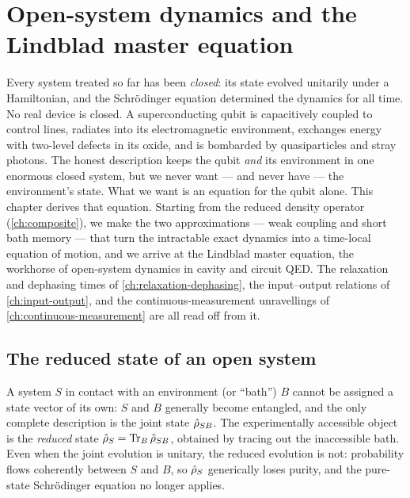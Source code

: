 \chapter{Open-system dynamics and the Lindblad master equation}
\label{ch:open-systems}

Every system treated so far has been \emph{closed}: its state
evolved unitarily under a Hamiltonian, and the Schrödinger
equation determined the dynamics for all time. No real device is
closed. A superconducting qubit is capacitively coupled to control
lines, radiates into its electromagnetic environment, exchanges
energy with two-level defects in its oxide, and is bombarded by
quasiparticles and stray photons. The honest description keeps the
qubit \emph{and} its environment in one enormous closed system, but
we never want --- and never have --- the environment's state. What
we want is an equation for the qubit alone. This chapter derives
that equation. Starting from the reduced density operator
(\cref{ch:composite}), we make the two approximations --- weak
coupling and short bath memory --- that turn the intractable exact
dynamics into a time-local equation of motion, and we arrive at the
Lindblad master equation, the workhorse of open-system dynamics in
cavity and circuit QED. The relaxation and dephasing times of
\cref{ch:relaxation-dephasing}, the input--output relations of
\cref{ch:input-output}, and the continuous-measurement
unravellings of \cref{ch:continuous-measurement} are all read off
from it.

\section{The reduced state of an open system}
\label{sec:reduced-state}

\begin{phenomenon}
A system $S$ in contact with an environment (or ``bath'') $B$
cannot be assigned a state vector of its own: $S$ and $B$ generally
become entangled, and the only complete description is the joint
state $\hat{\rho}_{SB}$. The experimentally accessible object is the
\emph{reduced} state $\hat{\rho}_S=\operatorname{Tr}_B\hat{\rho}_{SB}$, obtained by
tracing out the inaccessible bath. Even when the joint evolution is
unitary, the reduced evolution is not: probability flows
coherently between $S$ and $B$, so $\hat{\rho}_S$ generically loses
purity, and the pure-state Schrödinger equation no longer applies.
\end{phenomenon}

